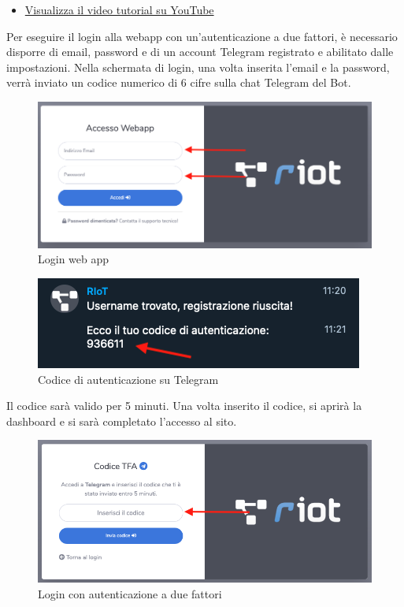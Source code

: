 	\begin{itemize}
		\item \href{https://www.youtube.com/watch?v=PjySMOLCtMA&list=PLPKYjnuIh1FA3b3jn_bwY_ztYzaFn2mIT&index=2}{Visualizza il video tutorial su YouTube} 
	\end{itemize}
	Per eseguire il login alla webapp con un’autenticazione a due fattori, è necessario disporre di email, password e di un account Telegram registrato e abilitato dalle impostazioni.
	Nella schermata di login, una volta inserita l'email e la password, verrà inviato un codice numerico di 6 cifre sulla chat Telegram del Bot. 
	\begin{figure}[H]
		\centering
		\includegraphics[scale=0.450]{res/images/membro/login.png}
		\caption{Login web app}
	\end{figure}
	\begin{figure}[H]
		\centering
		\includegraphics[scale=0.600]{res/images/membro/tokenTFA.png}
		\caption{Codice di autenticazione su Telegram}
	\end{figure}
	Il codice sarà valido per 5 minuti. Una volta inserito il codice, si aprirà la dashboard e si sarà completato l'accesso al sito.
	\begin{figure}[H]
		\centering
		\includegraphics[scale=0.600]{res/images/membro/loginTFA.png}
		\caption{Login con autenticazione a due fattori}
	\end{figure}


